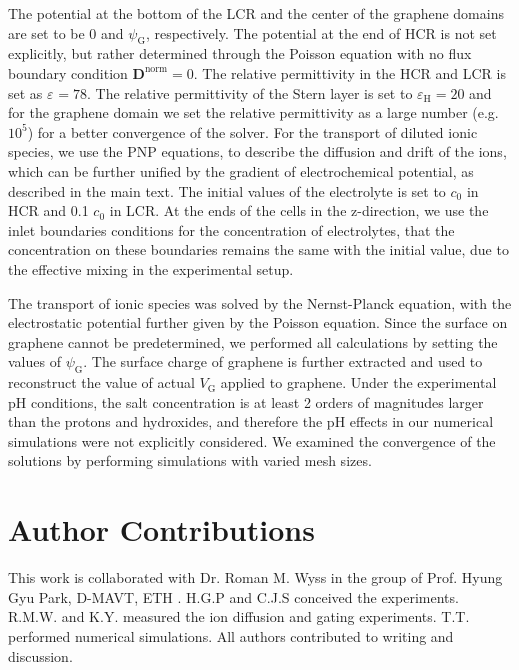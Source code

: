The potential at the
bottom of the LCR and the center of the graphene domains are set to be
0 and $\psi_{\mathrm{G}}$, respectively. The potential at the end of
HCR is not set explicitly, but rather determined through the Poisson
equation with no flux boundary condition
$\symbf{D}^{\mathrm{norm}}=0$. The relative permittivity in the
HCR and LCR is set as $\varepsilon_{\mathrm{}}=78$. The relative
permittivity of the Stern layer is set to
$\varepsilon_{\mathrm{H}}=20$\autocite{Conway_1951} and for the graphene
domain we set the relative permittivity as a large number
(e.g. $10^{5}$) for a better convergence of the solver.  For the
transport of diluted ionic species, we use the PNP equations, to
describe the diffusion and drift of the ions, which can be further
unified by the gradient of electrochemical potential, as described in
the main text. The initial values of the electrolyte is set to $c_{0}$
in HCR and 0.1 $c_{0}$ in LCR. At the ends of the cells in the
z-direction, we use the inlet boundaries conditions for the
concentration of electrolytes, that the concentration on these
boundaries remains the same with the initial value, due to the
effective mixing in the experimental setup.

The
transport of ionic species was solved by the Nernst-Planck equation,
with the electrostatic potential further given by the Poisson
equation. Since the surface on graphene cannot be predetermined, we
performed all calculations by setting the values of
$\psi_{\mathrm{G}}$. The surface charge of graphene is further
extracted and used to reconstruct the value of actual $V_{\mathrm{G}}$
applied to graphene.  Under the experimental pH conditions, the salt
  concentration is at least 2 orders of magnitudes larger than the
  protons and hydroxides, and therefore the pH effects in our
  numerical simulations were not explicitly considered.  We examined
the convergence of the solutions by performing simulations with varied
mesh sizes. 



\section{Author Contributions}
\label{sec:np-np-author-contrib}

This work is collaborated with Dr. Roman M. Wyss in the group of
Prof. Hyung Gyu Park, D-MAVT, ETH \zurich{}.  H.G.P and C.J.S
conceived the experiments. R.M.W. and K.Y. measured the ion diffusion
and gating experiments. T.T. performed numerical simulations. All
authors contributed to writing and discussion.

























